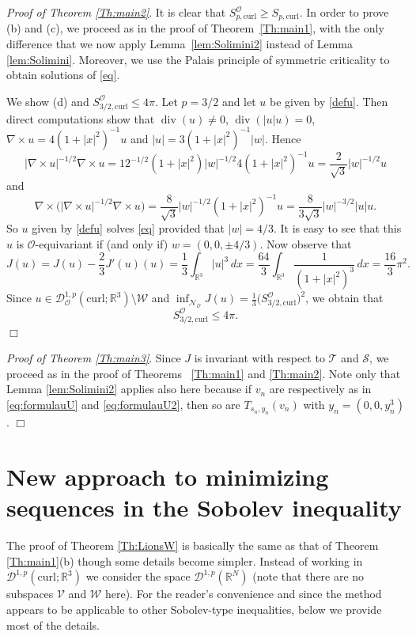 \documentclass[12pt,leqno,twoside]{amsart}
\newenvironment{altproof}[1]
{\noindent%
{\em Proof of {#1}}.}
{\nopagebreak\mbox{}\hfill $\Box$\par\addvspace{0.5cm}}
\def\div{\mathop{\mathrm{div}}}
\def\R{\mathbb{R}}
\def\curl{\mathrm{curl}}
\def\Wc{\mathscr{W}}
\newcommand{\cD}{{\mathcal D}}
\newcommand{\cN}{{\mathcal N}}
\newcommand{\cO}{{\mathcal O}}
\newcommand{\cS}{{\mathcal S}}
\newcommand{\cT}{{\mathcal T}}
\newcommand{\cV}{{\mathcal V}}
\newcommand{\cW}{{\mathcal W}}
\def\Wc{\cD^{1,p}(\curl;\R^3)}
\def\Wco{\cD^{1,p}_{\cO}(\curl;\R^3)}
\def\curlop{\nabla\times}
\numberwithin{equation}{section}
\begin{document}
\begin{altproof}{Theorem \ref{Th:main2}} It is clear that $S_{p,\curl}^{\cO}\geq S_{p,\curl}$.
In order to prove (b) and (c), we proceed as in the proof of Theorem~\ref{Th:main1}, 
with the only difference that we now apply Lemma~\ref{lem:Solimini2} instead of Lemma \ref{lem:Solimini}. Moreover, we use the Palais principle of symmetric criticality \cite[Theorem 5.1]{Palais} to obtain solutions of \eqref{eq}.


We show (d) and $S_{3/2,\curl}^{\cO}\leq4\pi$.
Let $p=3/2$ and let $u$ be given by \eqref{defu}.
Then direct computations show that $\div(u)\neq 0$, $\div(|u|u)=0$, $\curlop u=4(1+|x|^2)^{-1}u$ and $|u|=3(1+|x|^2)^{-1}|w|$. Hence
$$|\curlop u|^{-1/2}\curlop u=12^{-1/2}(1+|x|^2)|w|^{-1/2}4(1+|x|^2)^{-1}u=\frac{2}{\sqrt{3}}|w|^{-1/2}u$$
and
$$\curlop\big(|\curlop u|^{-1/2}\curlop u\big)=\frac{8}{\sqrt{3}}|w|^{-1/2}(1+|x|^2)^{-1}u=\frac{8}{3\sqrt{3}}|w|^{-3/2}|u|u.$$
So $u$ given by \eqref{defu} solves \eqref{eq} provided that $|w|=4/3$. It is easy to see that this $u$ is $\cO$-equivariant if (and only if) $w=(0,0,\pm4/3)$.
Now observe that
\begin{equation*}
J(u)=J(u)-\frac23J'(u)(u)=\frac13\int_{\R^3}|u|^{3}\,dx=\frac{64}3\int_{\R^3}\frac{1}{(1+|x|^2)^3}\,dx 
=\frac{16}3\pi^2. 
\end{equation*}
Since $u\in \Wco\setminus\cW$ and $\inf_{\cN_\cO}J(u)=\frac13\big(S_{3/2,\curl}^{\cO}\big)^{2}$, we obtain that
$$S_{3/2,\curl}^{\cO}\leq 4\pi.$$
\end{altproof}






\begin{altproof}{Theorem \ref{Th:main3}}
Since $J$ is invariant with respect to $\cT$ and $\cS$, we proceed as in the proof of Theorems ~\ref{Th:main1} and \ref{Th:main2}. Note only that Lemma \ref{lem:Solimini2} applies also here because if $v_n$ are respectively as in \eqref{eq:formulauU} and \eqref{eq:formulauU2}, then so are $T_{s_n,y_n}(v_n)$ with $y_n=(0,0,y_n^3)$.  
\end{altproof}


\section{New approach to minimizing sequences in the Sobolev inequality}\label{sec:Lions}

The proof of Theorem \ref{Th:LionsW} is basically the same as that of Theorem \ref{Th:main1}(b) though some details become simpler. Instead of working in $\Wc$ we consider the space $\cD^{1,p}(\R^N)$ (note that there are no subspaces $\cV$ and $\cW$ here). For the reader's convenience and since the method appears to be applicable to other Sobolev-type inequalities, below we provide most of the details.
\end{document}

